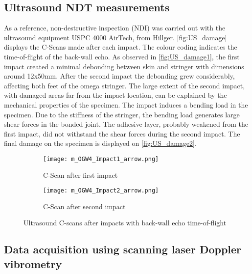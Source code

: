\documentclass[times,final]{elsarticle}
\begin{document}
\subsection{Ultrasound NDT measurements}

As a reference, non-destructive inspection (NDI) was carried out with the ultrasound equipment USPC 4000 AirTech, from Hillger. \autoref{fig:US_damage} displays the C-Scans made after each impact. The colour coding indicates the time-of-flight of the back-wall echo. As observed in \autoref{fig:US_damage1}, the first impact created a minimal debonding between skin and stringer with dimensions around 12x50mm. After the second impact the debonding grew considerably, affecting both feet of the omega stringer. 
{\color{red}The large extent of the second impact, with damaged areas far from the impact location, can be explained by the mechanical properties of the specimen. The impact induces a bending load in the specimen. Due to the stiffness of the stringer, the bending load generates large shear forces in the bonded joint. The adhesive layer, probably weakened from the first impact, did not withstand the shear forces during the second impact.}
The final damage on the specimen is displayed on \autoref{fig:US_damage2}.

\begin{figure} [htp]
	\centering
	\begin{subfigure}[b]{\textwidth}
	\centering
		\texttt{[image: m\_OGW4\_Impact1\_arrow.png]}
		\caption{C-Scan after first impact}
		\label{fig:US_damage1}
	\end{subfigure}
	
	\begin{subfigure}[b]{\textwidth}
	\centering
		\texttt{[image: m\_OGW4\_Impact2\_arrow.png]}
		\caption{C-Scan after second impact}
		\label{fig:US_damage2}
	\end{subfigure}
	\caption{Ultrasound C-scans after impacts with back-wall echo time-of-flight}
	\label{fig:US_damage}
\end{figure}

\subsection{Data acquisition using scanning laser Doppler vibrometry}
\end{document}
